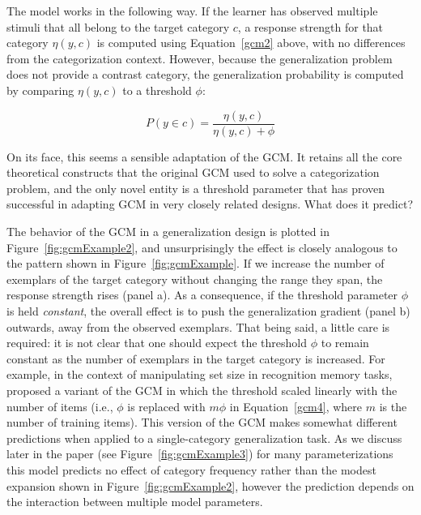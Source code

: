 \documentclass[doc,apacite]{apa6}
\begin{document}
The model works in the following way. If the learner has observed multiple stimuli that all belong to the target category $c$, a response strength for that category $\eta(y,c)$ is computed using Equation~\ref{gcm2} above, with no differences from the categorization context. However, because the generalization problem does not provide a contrast category, the generalization probability is computed by comparing $\eta(y,c)$ to a threshold $\phi$:

\begin{equation}
\label{gcm4}
P(y \in c) = \frac{\eta(y,c)}{\eta(y,c) + \phi} 
\end{equation}

On its face, this seems a sensible adaptation of the GCM. It retains all the core theoretical constructs that the original GCM used to solve a categorization problem, and the only novel entity is a threshold parameter that has proven successful in adapting GCM in very closely related designs. What does it predict?

The behavior of the GCM in a generalization design is plotted in Figure~\ref{fig:gcmExample2}, and unsurprisingly the effect is closely analogous to the pattern shown in Figure~\ref{fig:gcmExample}. If we increase the number of exemplars of the target category without changing the range they span, the response strength rises (panel a). As a consequence, if the threshold parameter $\phi$ is held {\it constant}, the overall effect is to push the generalization gradient (panel b) outwards, away from the observed exemplars. That being said, a little care is required: it is not clear that one should expect the threshold $\phi$ to remain constant as the number of exemplars in the target category is increased. For example, in the context of manipulating set size in recognition memory tasks,  proposed a variant of the GCM in which the threshold scaled linearly with the number of items (i.e., $\phi$ is replaced with $m\phi$ in Equation~\ref{gcm4}, where $m$ is the number of training items). This version of the GCM makes somewhat different predictions when applied to a single-category generalization task. As we discuss later in the paper (see Figure~\ref{fig:gcmExample3}) for many parameterizations this model predicts no effect of category frequency rather than the modest expansion shown in Figure~\ref{fig:gcmExample2}, however the prediction depends on the interaction between multiple model parameters. 
\end{document}
